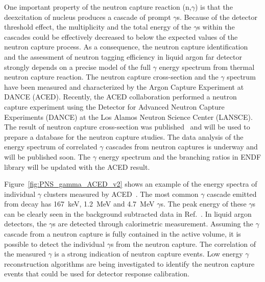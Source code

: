 One important property of the neutron capture reaction (n,$\gamma$) is that the deexcitation of  nucleus produces a cascade of prompt $\gamma$s. Because of the detector threshold effect, the multiplicity and the
total energy of the $\gamma$s within the cascades could be effectively decreased to below the expected values of the neutron capture process. As a consequence, the neutron capture identification and the assessment of neutron tagging efficiency in liquid argon far detector strongly depends on a precise model of the full $\gamma$ energy spectrum from thermal neutron capture reaction. The neutron capture cross-section and the $\gamma$ spectrum have been measured and characterized by the Argon Capture Experiment at DANCE (ACED). Recently, the ACED collaboration performed a neutron capture experiment using the Detector for Advanced Neutron Capture Experiments (DANCE) at the Los Alamos Neutron Science Center (LANSCE). The result of neutron capture cross-section was published~\cite{Fischer:2019qfr} and will be used to prepare a database for the neutron capture studies. The data analysis of the energy spectrum of correlated $\gamma$ cascades from neutron captures is underway and will be published soon. 
The $\gamma$ energy spectrum and the branching ratios in ENDF library will be updated with the ACED result. 

Figure~\ref{fig:PNS_gamma_ACED_v2} shows an example of the energy spectra of individual $\gamma$ clusters measured by ACED~\cite{Fischer:2019qfr}. The most common $\gamma$ cascade emitted from  decay has \SI{167}{keV}, \SI{1.2}{MeV} and \SI{4.7}{MeV} $\gamma$s. The peak energy of these $\gamma$s can be clearly seen in the background subtracted data in Ref.~\cite{Fischer:2019qfr}. In liquid argon detectors, the $\gamma$s are detected through calorimetric measurement. Assuming the $\gamma$ cascade from a neutron capture is fully contained in the active volume, it is possible to detect the individual $\gamma$s from the neutron capture. The correlation of the measured $\gamma$ is a strong indication of neutron capture events. Low energy $\gamma$ reconstruction algorithms are being investigated to identify the neutron capture events that could be used for detector response calibration. 

